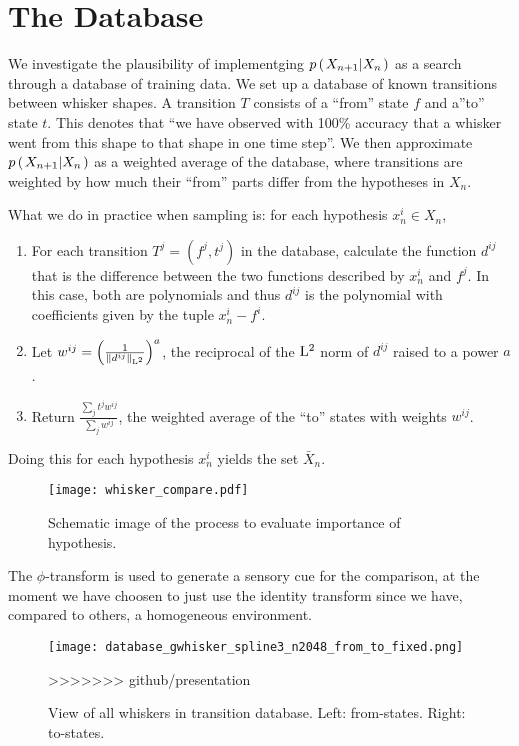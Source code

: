 \section*{The Database}

We investigate the plausibility of implementging $p\left(\left. X_{n+1} \middle\vert X_n \right.\right)$ as a search through a database of training data. We set up a database of known transitions between whisker shapes. A transition $T$ consists of a ``from'' state $f$ and a''to'' state $t$. This denotes that ``we have observed with 100\% accuracy that a whisker went from this shape to that shape in one time step''. We then approximate $p\left(\left. X_{n+1} \middle\vert X_n \right.\right)$ as a weighted average of the database, where transitions are weighted by how much their ``from'' parts differ from the hypotheses in $X_n$.

What we do in practice when sampling is: for each hypothesis $x_n^i \in X_n$,

\begin{enumerate}
  \item For each transition $T^j = (f^j, t^j)$ in the database, calculate the function $d^{ij}$ that is the difference between the two functions described by $x_n^i$ and $f^j$. In this case, both are polynomials and thus $d^{ij}$ is the polynomial with coefficients given by the tuple $x_n^i - f^i$.
  \item Let $w^{ij} = \left(\frac{1}{\left\|d^{ij}\right\|_{\mathrm{L}^2}}\right)^a$, the reciprocal of the $\mathrm{L}^2$ norm of $d^{ij}$ raised to a power $a$.
  \item Return $\frac{\sum_j t^j w^{ij}}{\sum_jw^{ij}}$, the weighted average of the ``to'' states with weights $w^{ij}$.
\end{enumerate}

Doing this for each hypothesis $x_n^i$ yields the set $\bar{X}_n$.

\begin{figure}
  \centering
  \texttt{[image: whisker\_compare.pdf]}
  \caption{Schematic image of the process to evaluate importance of hypothesis.}
  \label{fig:whisker_compare}
\end{figure}

The $\phi$-transform is used to generate a sensory cue for the comparison, at the moment we have choosen to just use the identity transform since we have, compared to others, a homogeneous environment.

\begin{figure}
  \centering
  \texttt{[image: database\_gwhisker\_spline3\_n2048\_from\_to\_fixed.png]}
  \caption{View of all whiskers in transition database. Left: from-states. Right: to-states.}
>>>>>>> github/presentation
  \label{fig:database}
\end{figure}

